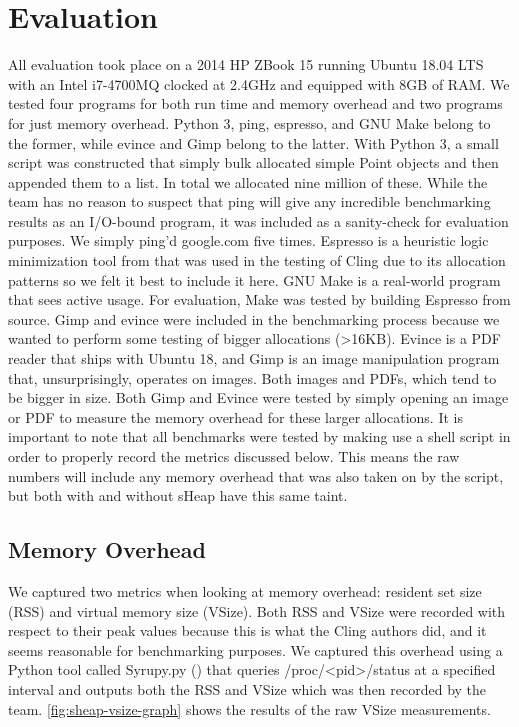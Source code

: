 \documentclass[conference]{IEEEtran}
\begin{document}
\section{Evaluation}
All evaluation took place on a 2014 HP ZBook 15 running Ubuntu 18.04 LTS with an Intel 
i7-4700MQ clocked at 2.4GHz and equipped with 8GB of RAM. We tested four programs for 
both run time and memory overhead and two programs for just memory overhead. Python 3, 
ping, espresso, and GNU Make belong to the former, while evince and Gimp belong to the 
latter. With Python 3, a small script was constructed that simply bulk allocated simple 
Point objects and then appended them to a list. In total we allocated nine million of 
these. While the team has no reason to suspect that ping will give any incredible 
benchmarking results as an I/O-bound program, it was included as a sanity-check for 
evaluation purposes. We simply ping’d google.com five times. Espresso is a heuristic 
logic minimization tool from \cite{b4} that was used in the testing of Cling due to 
its allocation patterns so we felt it best to include it here. GNU Make is a 
real-world program that sees active usage. For evaluation, Make was tested by building 
Espresso from source. Gimp and evince were included in the benchmarking process because 
we wanted to perform some testing of bigger allocations (>16KB). Evince is a PDF reader 
that ships with Ubuntu 18, and Gimp is an image manipulation program that, 
unsurprisingly, operates on images. Both images and PDFs, which tend to be bigger in 
size. Both Gimp and Evince were tested by simply opening an image or PDF to measure the 
memory overhead for these larger allocations. It is important to note that all 
benchmarks were tested by making use a shell script in order to properly record the 
metrics discussed below. This means the raw numbers will include any memory overhead that 
was also taken on by the script, but both with and without sHeap have this same taint.

\subsection{Memory Overhead}
We captured two metrics when looking at memory overhead: resident set size (RSS) and 
virtual memory size (VSize). Both RSS and VSize were recorded with respect to their peak 
values because this is what the Cling authors did, and it seems reasonable for 
benchmarking purposes. We captured this overhead using a Python tool called Syrupy.py 
(\cite{b5}) that queries /proc/<pid>/status at a specified interval and outputs both the 
RSS and VSize which was then recorded by the team. \ref{fig:sheap-vsize-graph} shows the 
results of the raw VSize measurements. 
\end{document}
